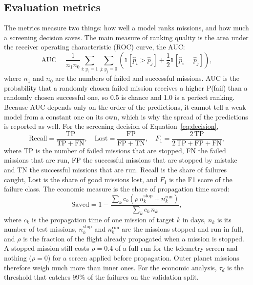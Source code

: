 \subsection{Evaluation metrics}
\label{sec:metrics}

The metrics measure two things: how well a model ranks missions, and how much a screening decision saves. The main measure of ranking quality is the area under the receiver operating characteristic (ROC) curve, the AUC:
\begin{equation}
\mathrm{AUC} = \frac{1}{n_1 n_0} \sum_{i : y_i = 1}{ \sum_{j : y_j = 0}{ \left( \mathbb{1} \left[ \hat{p}_i > \hat{p}_j \right] + \frac{1}{2} \mathbb{1} \left[ \hat{p}_i = \hat{p}_j \right] \right) } },
\label{eq:auc}
\end{equation}
where $n_1$ and $n_0$ are the numbers of failed and successful missions. AUC is the probability that a randomly chosen failed mission receives a higher P(fail) than a randomly chosen successful one, so 0.5 is chance and 1.0 is a perfect ranking. Because AUC depends only on the order of the predictions, it cannot tell a weak model from a constant one on its own, which is why the spread of the predictions is reported as well. For the screening decision of Equation~\ref{eq:decision},
\begin{equation}
\mathrm{Recall} = \frac{\mathrm{TP}}{\mathrm{TP} + \mathrm{FN}}, \quad \mathrm{Lost} = \frac{\mathrm{FP}}{\mathrm{FP} + \mathrm{TN}}, \quad F_1 = \frac{2\,\mathrm{TP}}{2\,\mathrm{TP} + \mathrm{FP} + \mathrm{FN}},
\label{eq:rates}
\end{equation}
where TP is the number of failed missions that are stopped, FN the failed missions that are run, FP the successful missions that are stopped by mistake and TN the successful missions that are run. Recall is the share of failures caught, Lost is the share of good missions lost, and $F_1$ is the F1 score of the failure class. The economic measure is the share of propagation time saved:
\begin{equation}
\mathrm{Saved} = 1 - \frac{ \sum_{k}{ c_k \left( \rho \, n_k^{\mathrm{stop}} + n_k^{\mathrm{run}} \right) } }{ \sum_{k}{ c_k \, n_k } },
\label{eq:saved}
\end{equation}
where $c_k$ is the propagation time of one mission of target $k$ in days, $n_k$ is its number of test missions, $n_k^{\mathrm{stop}}$ and $n_k^{\mathrm{run}}$ are the missions stopped and run in full, and $\rho$ is the fraction of the flight already propagated when a mission is stopped. A stopped mission still costs $\rho = 0.4$ of a full run for the telemetry screen and nothing ($\rho = 0$) for a screen applied before propagation. Outer planet missions therefore weigh much more than inner ones. For the economic analysis, $\tau_d$ is the threshold that catches 99\% of the failures on the validation split.

